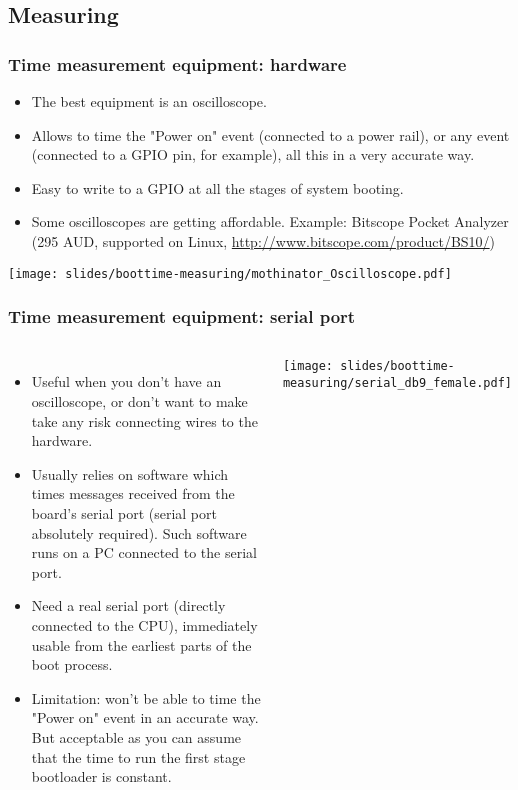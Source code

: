 \subsection{Measuring}

\begin{frame}
\frametitle{Time measurement equipment: hardware}
\begin{itemize}
\item The best equipment is an oscilloscope.
\item Allows to time the "Power on" event (connected to a power rail),
      or any event (connected to a GPIO pin, for example), all this
      in a very accurate way.
\item Easy to write to a GPIO at all the stages of system booting.
\item Some oscilloscopes are getting affordable. Example: Bitscope
      Pocket Analyzer (295 AUD, supported on Linux, \url{http://www.bitscope.com/product/BS10/})
\end{itemize}
\begin{center}
    \texttt{[image: slides/boottime-measuring/mothinator\_Oscilloscope.pdf]}
\end{center}
\end{frame}

\begin{frame}
\frametitle{Time measurement equipment: serial port}
\begin{columns}
\begin{itemize}
\item Useful when you don't have an oscilloscope, or don't want to make
      take any risk connecting wires to the hardware.
\item Usually relies on software which times messages received from the board's
      serial port (serial port absolutely required). Such software 
      runs on a PC connected to the serial port. 
\item Need a real serial port (directly connected to the CPU),
      immediately usable from the earliest parts of the boot process.
\item Limitation: won't be able to time the "Power on" event in
      an accurate way. But acceptable as you can assume that
      the time to run the first stage bootloader is constant.
\end{itemize}
\texttt{[image: slides/boottime-measuring/serial\_db9\_female.pdf]}
\end{columns}
\end{frame}

